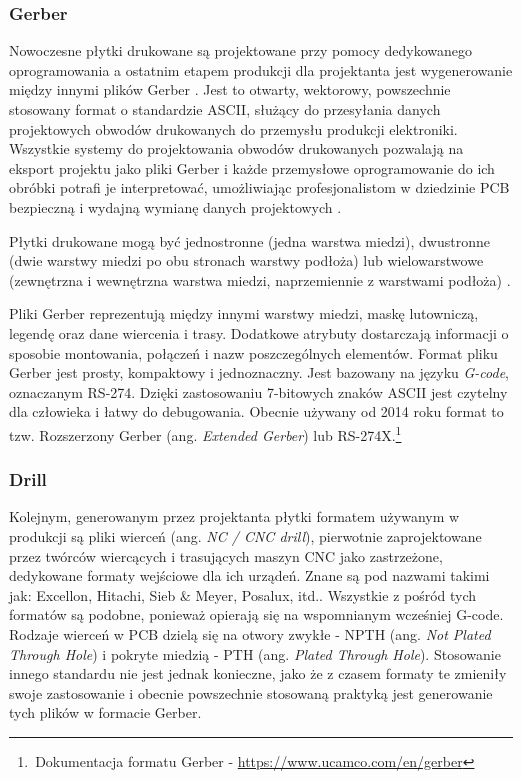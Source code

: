 \documentclass{xmgr}
\begin{document}
\subsubsection {Gerber}
Nowoczesne płytki drukowane są projektowane przy pomocy dedykowanego oprogramowania a ostatnim etapem produkcji dla projektanta jest wygenerowanie między innymi plików Gerber \cite{Khandpur}.
Jest to otwarty, wektorowy, powszechnie stosowany format o standardzie ASCII, służący do przesyłania danych projektowych obwodów drukowanych do przemysłu produkcji elektroniki. Wszystkie systemy do projektowania obwodów drukowanych pozwalają na eksport projektu jako pliki Gerber i każde przemysłowe oprogramowanie do ich obróbki potrafi je interpretować, umożliwiając profesjonalistom w dziedzinie PCB bezpieczną i wydajną wymianę danych projektowych \cite{Williams}.

Płytki drukowane mogą być jednostronne (jedna warstwa miedzi), dwustronne (dwie warstwy miedzi po obu stronach warstwy podłoża) lub wielowarstwowe (zewnętrzna i wewnętrzna warstwa miedzi, naprzemiennie z warstwami podłoża) \cite{schroeder}.

Pliki Gerber reprezentują między innymi warstwy miedzi, maskę lutowniczą, legendę oraz dane wiercenia i trasy. Dodatkowe atrybuty dostarczają informacji o sposobie montowania, połączeń i nazw poszczególnych elementów. Format pliku Gerber jest prosty, kompaktowy i jednoznaczny. Jest bazowany na języku \emph{G-code}, oznaczanym RS-274. Dzięki zastosowaniu 7-bitowych znaków ASCII jest czytelny dla człowieka i łatwy do debugowania. Obecnie używany od 2014 roku format to tzw. Rozszerzony Gerber (ang. \emph{Extended Gerber}) lub RS-274X.\footnote{\,Dokumentacja formatu Gerber - \url{https://www.ucamco.com/en/gerber}}

\subsubsection {Drill}
Kolejnym, generowanym przez projektanta płytki formatem używanym w produkcji są pliki wierceń (ang. \emph{NC / CNC drill}), pierwotnie zaprojektowane przez twórców wiercących i trasujących maszyn CNC jako zastrzeżone, dedykowane formaty wejściowe dla ich urządeń. Znane są pod nazwami takimi jak: Excellon, Hitachi, Sieb \& Meyer, Posalux, itd.\cite{Charras}. Wszystkie z pośród tych formatów są podobne, ponieważ opierają się na wspomnianym wcześniej G-code. Rodzaje wierceń w PCB dzielą się na otwory zwykłe - NPTH (ang. \emph{Not Plated Through Hole}) i pokryte miedzią - PTH (ang. \emph{Plated Through Hole})\cite{voldman}. Stosowanie innego standardu nie jest jednak konieczne, jako że z czasem formaty te zmieniły swoje zastosowanie i obecnie powszechnie stosowaną praktyką jest generowanie tych plików w formacie Gerber.
\end{document}
